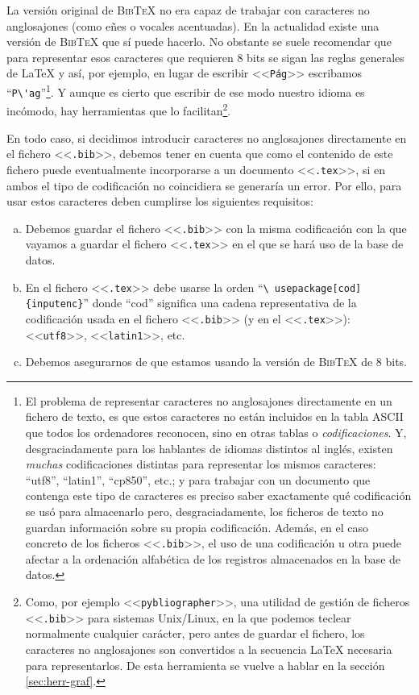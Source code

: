\documentclass[a4paper,11pt]{article}
\def\btx-{\textsc{Bib\TeX}}
\def\ltx-{\LaTeX}
\def\ltr#1-{<<\texttt{#1}>>}
\def\tpf#1-{\ltr.#1-}
\def\cmd#1-{``\texttt{\textbackslash#1}''}
\begin{document}
La  versión original  de \btx-  no  era capaz  de trabajar  con caracteres  no
anglosajones (como  eñes o vocales  acentuadas).  En la actualidad  existe una
versión de  \btx- que sí  puede hacerlo. No  obstante se suele  recomendar que
para  representar esos caracteres  que requieren  8 bits  se sigan  las reglas
generales  de  \ltx- y  así,  por  ejemplo, en  lugar  de  escribir \ltr  Pág-
escribamos ``\verb|P\'ag|''\footnote{El problema  de representar caracteres no
  anglosajones directamente en un fichero de texto, es que estos caracteres no
  están incluidos en la tabla  ASCII que todos los ordenadores reconocen, sino
  en  otras  tablas o  \emph{codificaciones}.   Y,  desgraciadamente para  los
  hablantes   de   idiomas   distintos   al  inglés,   existen   \emph{muchas}
  codificaciones distintas  para representar los  mismos caracteres: ``utf8'',
  ``latin1'', ``cp850'', etc.;  y para trabajar con un  documento que contenga
  este tipo de caracteres es preciso saber exactamente qué codificación se usó
  para almacenarlo  pero, desgraciadamente, los  ficheros de texto  no guardan
  información sobre su propia codificación. Además, en el caso concreto de los
  ficheros \tpf  bib-, el uso  de una codificación  u otra puede afectar  a la
  ordenación alfabética de los registros  almacenados en la base de datos.}. Y
aunque es  cierto que  escribir de  ese modo nuestro  idioma es  incómodo, hay
herramientas que lo  facilitan\footnote{Como, por ejemplo \ltr pybliographer-,
  una utilidad de  gestión de ficheros \tpf bib-  para sistemas Unix/Linux, en
  la que podemos teclear normalmente cualquier carácter, pero antes de guardar
  el fichero,  los caracteres no  anglosajones son convertidos a  la secuencia
  \ltx- necesaria para representarlos. De  esta herramienta se vuelve a hablar
  en la sección \ref{sec:herr-graf}.}.

En todo caso, si  decidimos introducir caracteres no anglosajones directamente
en el fichero \tpf bib-, debemos tener en cuenta que como el contenido de este
fichero puede eventualmente incorporarse a un documento \tpf tex-, si en ambos
el tipo de  codificación no coincidiera se generaría un  error. Por ello, para
usar estos caracteres deben cumplirse los siguientes requisitos:

\begin{enumerate}[a)]

\item Debemos  guardar el fichero \tpf  bib- con la misma  codificación con la
  que vayamos a guardar el fichero \tpf tex-  en el que se hará uso de la base
  de datos.

\item   En    el   fichero   \tpf    tex-   debe   usarse   la    orden   \cmd
  usepackage[cod]\{inputenc\}-    donde   ``cod''    significa    una   cadena
  representativa de  la codificación usada  en el fichero  \tpf bib- (y  en el
  \tpf tex-): \ltr utf8-, \ltr latin1-, etc.

\item Debemos asegurarnos de que estamos usando la versión de \btx- de 8 bits.

\end{enumerate}
\end{document}

